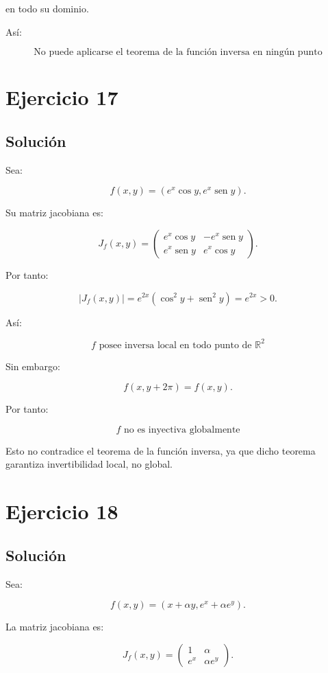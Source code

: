 \documentclass[11pt,a4paper]{article}
\newcommand{\R}{\mathbb{R}}
\newcommand{\sen}{\operatorname{sen}}
\begin{document}
en todo su dominio.

Así:

\[
\boxed{
\text{No puede aplicarse el teorema de la función inversa en ningún punto}
}
\]

\section{Ejercicio 17}
\subsection{Solución}

Sea:

\[
f(x,y)
=
\left(
e^x\cos y,
e^x\sen y
\right).
\]

Su matriz jacobiana es:

\[
J_f(x,y)
=
\begin{pmatrix}
e^x\cos y&-e^x\sen y\\
e^x\sen y&e^x\cos y
\end{pmatrix}.
\]

Por tanto:

\[
|J_f(x,y)|
=
e^{2x}
\left(
\cos^2y+\sen^2y
\right)
=
e^{2x}>0.
\]

Así:

\[
\boxed{
f\text{ posee inversa local en todo punto de }\R^2
}
\]

Sin embargo:

\[
f(x,y+2\pi)=f(x,y).
\]

Por tanto:

\[
\boxed{
f\text{ no es inyectiva globalmente}
}
\]

Esto no contradice el teorema de la función inversa, ya que dicho teorema garantiza invertibilidad local, no global.

\section{Ejercicio 18}
\subsection{Solución}

Sea:

\[
f(x,y)
=
\left(
x+\alpha y,
e^x+\alpha e^y
\right).
\]

La matriz jacobiana es:

\[
J_f(x,y)
=
\begin{pmatrix}
1&\alpha\\
e^x&\alpha e^y
\end{pmatrix}.
\]
\end{document}
